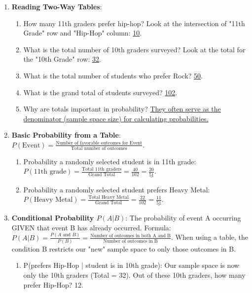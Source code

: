 \documentclass[12pt]{article}
\begin{document}
\begin{enumerate}[label=37-38.\arabic*]
    \item \textbf{Reading Two-Way Tables}:
    \begin{enumerate}[label=\alph*)]
        \item How many 11th graders prefer hip-hop? Look at the intersection of "11th Grade" row and "Hip-Hop" column: \underline{10}.
        \item What is the total number of 10th graders surveyed? Look at the total for the "10th Grade" row: \underline{32}.
        \item What is the total number of students who prefer Rock? \underline{50}.
        \item What is the grand total of students surveyed? \underline{102}.
        \item Why are totals important in probability? \underline{They often serve as the denominator (sample space size) for calculating probabilities.}
    \end{enumerate}
    \item \textbf{Basic Probability from a Table}: \( P(\text{Event}) = \frac{\text{Number of favorable outcomes for Event}}{\text{Total number of outcomes}} \).
    \begin{enumerate}[label=\alph*)]
        \item Probability a randomly selected student is in 11th grade: \( P(\text{11th grade}) = \frac{\text{Total 11th graders}}{\text{Grand Total}} = \frac{40}{102} = \underline{\frac{20}{51}} \).
        \item Probability a randomly selected student prefers Heavy Metal: \( P(\text{Heavy Metal}) = \frac{\text{Total Heavy Metal}}{\text{Grand Total}} = \frac{22}{102} = \underline{\frac{11}{51}} \).
    \end{enumerate}
    \item \textbf{Conditional Probability \( P(A|B) \)}: The probability of event A occurring GIVEN that event B has already occurred.
    Formula: \( P(A|B) = \frac{P(A \text{ and } B)}{P(B)} = \frac{\text{Number of outcomes in both A and B}}{\text{Number of outcomes in B}} \).
    When using a table, the condition B restricts our "new" sample space to only those outcomes in B.
    \begin{enumerate}[label=\alph*)]
        \item P(prefers Hip-Hop | student is in 10th grade):
        Our sample space is now only the 10th graders (Total = 32).
        Out of these 10th graders, how many prefer Hip-Hop? 12.

\end{enumerate}
\end{enumerate}
\end{document}

